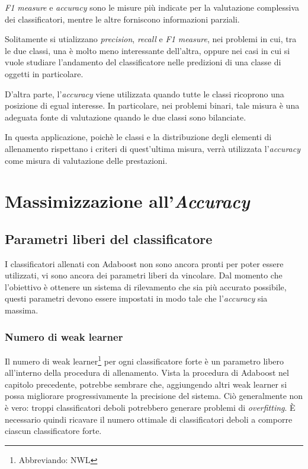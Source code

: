        \emph{F1 measure} e \emph{accuracy} sono le misure più indicate per la valutazione complessiva dei classificatori, mentre le altre forniscono informazioni parziali.

        Solitamente si utializzano \emph{precision}, \emph{recall} e \emph{F1 measure}, nei problemi in cui, tra le due classi, una è molto meno interessante dell'altra, oppure nei casi in cui si vuole studiare l'andamento del classificatore nelle predizioni di una classe di oggetti in particolare.

        D'altra parte, l'\emph{accuracy} viene utilizzata quando tutte le classi ricoprono una posizione di egual interesse. 
        In particolare, nei problemi binari, tale misura è una adeguata fonte di valutazione quando le due classi sono bilanciate.

        In questa applicazione, poichè le classi e la distribuzione degli elementi di allenamento rispettano i criteri di quest'ultima misura, verrà utilizzata l'\emph{accuracy} come misura di valutazione delle prestazioni.
        

    \section{Massimizzazione all'\emph{Accuracy}}
    \label{sec:accuracy_maximization}
        \subsection{Parametri liberi del classificatore}
        I classificatori allenati con Adaboost non sono ancora pronti per poter essere utilizzati, vi sono ancora dei parametri liberi da vincolare.
        Dal momento che l'obiettivo è ottenere un sistema di rilevamento che sia più accurato possibile, questi parametri devono essere impostati in modo tale che l'\emph{accuracy} sia massima.
            \subsubsection{Numero di weak learner}
                Il numero di weak learner\footnote{Abbreviando: NWL} per ogni classificatore forte è un parametro libero all'interno della procedura di allenamento.
                Vista la procedura di Adaboost nel capitolo precedente, potrebbe sembrare che, aggiungendo altri weak learner si possa migliorare progressivamente la precisione del sistema.
                Ciò generalmente non è vero: troppi classificatori deboli potrebbero generare problemi di \emph{overfitting}.
                È necessario quindi ricavare il numero ottimale di classificatori deboli a comporre ciascun classificatore forte.

